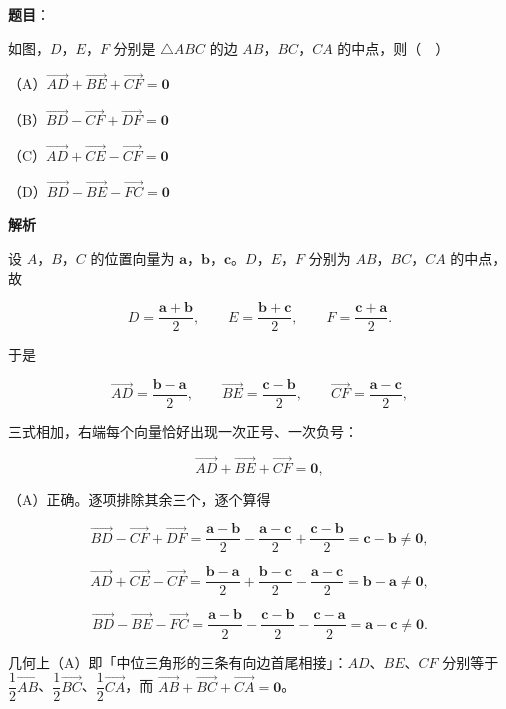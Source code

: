 \begin{answer}

\textbf{题目}：

如图，$D$，$E$，$F$ 分别是 $\triangle ABC$ 的边 $AB$，$BC$，$CA$ 的中点，则（　）

（A）$\overrightarrow{AD}+\overrightarrow{BE}+\overrightarrow{CF}=\boldsymbol 0$

（B）$\overrightarrow{BD}-\overrightarrow{CF}+\overrightarrow{DF}=\boldsymbol 0$

（C）$\overrightarrow{AD}+\overrightarrow{CE}-\overrightarrow{CF}=\boldsymbol 0$

（D）$\overrightarrow{BD}-\overrightarrow{BE}-\overrightarrow{FC}=\boldsymbol 0$
\nopagebreak[4]
\begin{center}\end{center}
\nopagebreak[4]
\textbf{解析}

设 $A$，$B$，$C$ 的位置向量为 $\boldsymbol a$，$\boldsymbol b$，$\boldsymbol c$。$D$，$E$，$F$ 分别为 $AB$，$BC$，$CA$ 的中点，故

\nopagebreak[4]
\[D=\frac{\boldsymbol a+\boldsymbol b}{2},\qquad E=\frac{\boldsymbol b+\boldsymbol c}{2},\qquad F=\frac{\boldsymbol c+\boldsymbol a}{2}.\]

于是

\nopagebreak[4]
\[\overrightarrow{AD}=\frac{\boldsymbol b-\boldsymbol a}{2},\qquad \overrightarrow{BE}=\frac{\boldsymbol c-\boldsymbol b}{2},\qquad \overrightarrow{CF}=\frac{\boldsymbol a-\boldsymbol c}{2},\]

三式相加，右端每个向量恰好出现一次正号、一次负号：

\nopagebreak[4]
\[\overrightarrow{AD}+\overrightarrow{BE}+\overrightarrow{CF}=\boldsymbol 0,\]

（A）正确。逐项排除其余三个，逐个算得

\nopagebreak[4]
\[\overrightarrow{BD}-\overrightarrow{CF}+\overrightarrow{DF}=\frac{\boldsymbol a-\boldsymbol b}{2}-\frac{\boldsymbol a-\boldsymbol c}{2}+\frac{\boldsymbol c-\boldsymbol b}{2}=\boldsymbol c-\boldsymbol b\neq\boldsymbol 0,\]

\nopagebreak[4]
\[\overrightarrow{AD}+\overrightarrow{CE}-\overrightarrow{CF}=\frac{\boldsymbol b-\boldsymbol a}{2}+\frac{\boldsymbol b-\boldsymbol c}{2}-\frac{\boldsymbol a-\boldsymbol c}{2}=\boldsymbol b-\boldsymbol a\neq\boldsymbol 0,\]

\nopagebreak[4]
\[\overrightarrow{BD}-\overrightarrow{BE}-\overrightarrow{FC}=\frac{\boldsymbol a-\boldsymbol b}{2}-\frac{\boldsymbol c-\boldsymbol b}{2}-\frac{\boldsymbol c-\boldsymbol a}{2}=\boldsymbol a-\boldsymbol c\neq\boldsymbol 0.\]

几何上（A）即「中位三角形的三条有向边首尾相接」：$AD$、$BE$、$CF$ 分别等于 $\dfrac12\overrightarrow{AB}$、$\dfrac12\overrightarrow{BC}$、$\dfrac12\overrightarrow{CA}$，而 $\overrightarrow{AB}+\overrightarrow{BC}+\overrightarrow{CA}=\boldsymbol 0$。


\end{answer}
